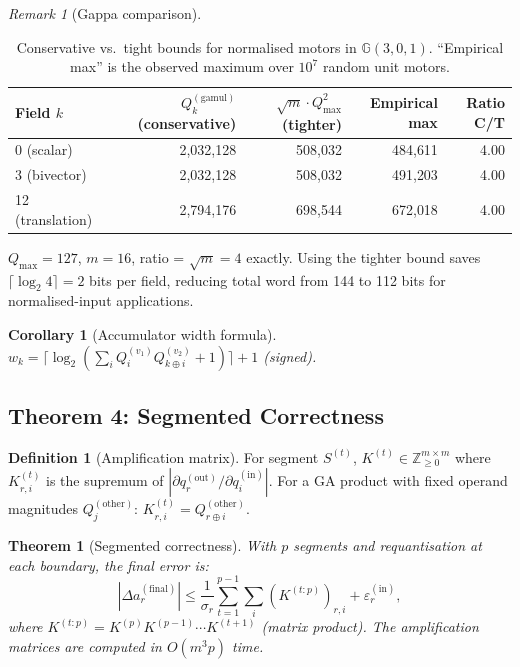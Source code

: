 \documentclass[11pt,a4paper]{article}
\theoremstyle{definition}
\newtheorem{definition}{Definition}[section]
\theoremstyle{plain}
\newtheorem{theorem}{Theorem}[section]
\newtheorem{corollary}{Corollary}[section]
\theoremstyle{remark}
\newtheorem{remark}{Remark}[section]
\newcommand{\GA}{\mathbb{G}}
\newcommand{\ceil}[1]{\lceil #1 \rceil}
\begin{document}
\begin{remark}[Gappa comparison]
\begin{table}[h]
\centering
\caption{Conservative vs.\ tight bounds for normalised motors in $\GA(3,0,1)$.
``Empirical max'' is the observed maximum over $10^7$ random unit motors.}
\label{tab:norm-bound}
\begin{tabular}{lrrrr}
\toprule
Field $k$ & $Q_k^{(\mathrm{gamul})}$ (conservative) & $\sqrt{m}\cdot Q_{\max}^2$ (tighter) & Empirical max & Ratio C/T \\
\midrule
0 (scalar) & 2{,}032{,}128 & 508{,}032 & 484{,}611 & 4.00 \\
3 (bivector) & 2{,}032{,}128 & 508{,}032 & 491{,}203 & 4.00 \\
12 (translation) & 2{,}794{,}176 & 698{,}544 & 672{,}018 & 4.00 \\
\bottomrule
\end{tabular}
\par\smallskip
\footnotesize $Q_{\max}=127$, $m=16$, ratio = $\sqrt{m}=4$ exactly.
Using the tighter bound saves $\lceil\log_2 4\rceil = 2$ bits per field,
reducing total word from 144 to 112 bits for normalised-input applications.
\end{table}

\begin{corollary}[Accumulator width formula]\label{cor:accum}
$w_k = \ceil{\log_2\!\left(\sum_i Q_i^{(v_1)}Q_{k\oplus i}^{(v_2)}+1\right)}+1$ (signed).
\end{corollary}

\subsection{Theorem 4: Segmented Correctness}
\label{sec:segmented}

\begin{definition}[Amplification matrix]
For segment $S^{(t)}$, $K^{(t)}\in\mathbb{Z}_{\ge0}^{m\times m}$
where $K^{(t)}_{r,i}$ is the supremum of
$|\partial q_r^{(\mathrm{out})}/\partial q_i^{(\mathrm{in})}|$.
For a GA product with fixed operand magnitudes $Q_j^{(\mathrm{other})}$:
$K^{(t)}_{r,i} = Q_{r\oplus i}^{(\mathrm{other})}$.
\end{definition}

\begin{theorem}[Segmented correctness]\label{thm:segmented}
With $p$ segments and requantisation at each boundary, the final error is:
\begin{equation}\label{eq:segmented-real}
  |\Delta a_r^{(\mathrm{final})}| \le \frac{1}{\sigma_r}
    \sum_{t=1}^{p-1}\sum_i (K^{(t:p)})_{r,i} + \varepsilon_r^{(\mathrm{in})},
\end{equation}
where $K^{(t:p)} = K^{(p)}K^{(p-1)}\cdots K^{(t+1)}$ (matrix product).
The amplification matrices are computed in $O(m^3 p)$ time.
\end{theorem}


\end{remark}
\end{document}
